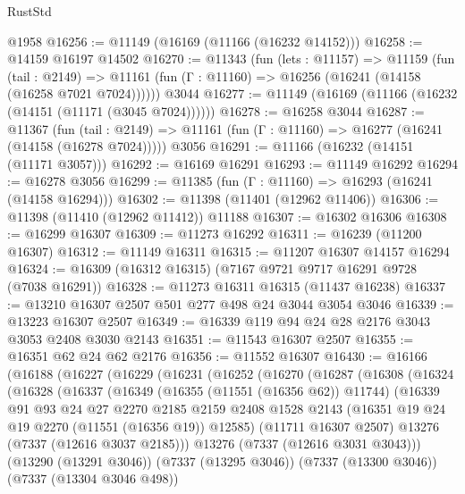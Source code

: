\begin{lexlean}{RustStd}
\begin{coremodule}
    @1958
@16256 := @11149 (@16169 (@11166 (@16232 @14152)))
@16258 := @14159 @16197 @14502
@16270 := @11343
    (fun (lets : @11157) =>
    @11159
      (fun (tail : @2149) =>
      @11161 (fun (Γ : @11160) => @16256 (@16241 (@14158 (@16258 @7021 @7024))))))
    @3044
@16277 := @11149 (@16169 (@11166 (@16232 (@14151 (@11171 (@3045 @7024))))))
@16278 := @16258 @3044
@16287 := @11367
    (fun (tail : @2149) => @11161 (fun (Γ : @11160) => @16277 (@16241 (@14158 (@16278 @7024)))))
    @3056
@16291 := @11166 (@16232 (@14151 (@11171 @3057)))
@16292 := @16169 @16291
@16293 := @11149 @16292
@16294 := @16278 @3056
@16299 := @11385 (fun (Γ : @11160) => @16293 (@16241 (@14158 @16294)))
@16302 := @11398 (@11401 (@12962 @11406))
@16306 := @11398 (@11410 (@12962 @11412)) @11188
@16307 := @16302 @16306
@16308 := @16299 @16307
@16309 := @11273 @16292
@16311 := @16239 (@11200 @16307)
@16312 := @11149 @16311
@16315 := @11207 @16307 @14157 @16294
@16324 := @16309 (@16312 @16315) (@7167 @9721 @9717 @16291 @9728 (@7038 @16291))
@16328 := @11273 @16311 @16315 (@11437 @16238)
@16337 := @13210 @16307 @2507 @501 @277 @498 @24 @3044 @3054 @3046
@16339 := @13223 @16307 @2507
@16349 := @16339 @119 @94 @24 @28 @2176 @3043 @3053 @2408 @3030 @2143
@16351 := @11543 @16307 @2507
@16355 := @16351 @62 @24 @62 @2176
@16356 := @11552 @16307
@16430 := @16166
    (@16188
      (@16227
        (@16229
          (@16231
            (@16252
              (@16270
                (@16287
                  (@16308
                    (@16324
                      (@16328
                        (@16337
                          (@16349
                            (@16355 (@11551 (@16356 @62)) @11744)
                            (@16339
                              @91
                              @93
                              @24
                              @27
                              @2270
                              @2185
                              @2159
                              @2408
                              @1528
                              @2143
                              (@16351 @19 @24 @19 @2270 (@11551 (@16356 @19)) @12585)
                              (@11711 @16307 @2507)
                              @13276
                              (@7337 (@12616 @3037 @2185)))
                            @13276
                            (@7337 (@12616 @3031 @3043)))
                          (@13290 (@13291 @3046))
                          (@7337 (@13295 @3046))
                          (@7337 (@13300 @3046))
                          (@7337 (@13304 @3046 @498))

\end{coremodule}
\end{lexlean}
